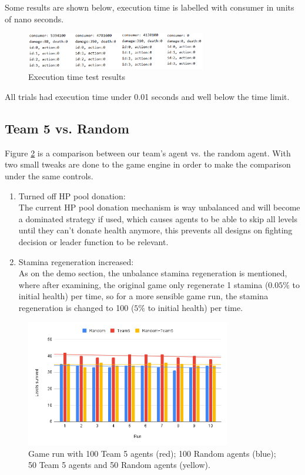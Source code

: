 Some results are shown below, execution time is labelled with consumer in units of nano seconds.

\begin{figure}[!ht]
    \centering
    \includegraphics[width=0.7\textwidth]{008_team_5_agent_design/images/12.png}
    \caption{Execution time test results}
    \label{executiontimetestresults}
\end{figure}

All trials had execution time under 0.01 seconds and well below the time limit.

\subsection{Team 5 vs. Random}
Figure \ref{fig:Team5vsRandom} is a comparison between our team's agent vs. the random agent. With two small tweaks are done to the game engine in order to make the comparison under the same controls.

\begin{enumerate}
    \item Turned off HP pool donation: \\
    The current HP pool donation mechanism is way unbalanced and will become a dominated strategy if used, which causes agents to be able to skip all levels until they can't donate health anymore, this prevents all designs on fighting decision or leader function to be relevant.
    \item Stamina regeneration increased: \\
    As on the demo section, the unbalance stamina regeneration is mentioned, where after examining, the original game only regenerate 1 stamina ($0.05\%$ to initial health) per time, so for a more sensible game run, the stamina regeneration is changed to 100 ($5\%$ to initial health) per time.
\end{enumerate}

\begin{figure}[!ht]
    \centering
    \includegraphics[width=0.8\textwidth]{008_team_5_agent_design/images/Team5vsRandom.png}
    \caption{Game run with 100 Team 5 agents (red); 100 Random agents (blue); 50 Team 5 agents and 50 Random agents (yellow).}
    \label{fig:Team5vsRandom}
\end{figure}

